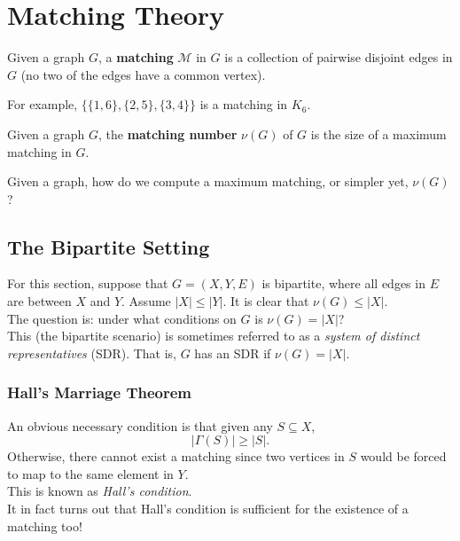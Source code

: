 
\section{Matching Theory}

\begin{fdef}
	Given a graph $G$, a \textbf{matching} $\mathcal{M}$ in $G$ is a collection of pairwise disjoint edges in $G$ (no two of the edges have a common vertex).
\end{fdef}

For example, $\{\{1,6\},\{2,5\},\{3,4\}\}$ is a matching in $K_6$.

\begin{fdef}
	Given a graph $G$, the \textbf{matching number} $\nu(G)$ of $G$ is the size of a maximum matching in $G$.
\end{fdef}

Given a graph, how do we compute a maximum matching, or simpler yet, $\nu(G)$?

	\subsection{The Bipartite Setting}

		For this section, suppose that $G = (X,Y,E)$ is bipartite, where all edges in $E$ are between $X$ and $Y$. Assume $|X| \le |Y|$.
		It is clear that $\nu(G) \le |X|$.\\

		The question is: under what conditions on $G$ is $\nu(G) = |X|$?\\
		This (the bipartite scenario) is sometimes referred to as a \emph{system of distinct representatives} (SDR). That is, $G$ has an SDR if $\nu(G) = |X|$.

		\subsubsection{Hall's Marriage Theorem}

			An obvious necessary condition is that given any $S\subseteq X$,
			\[ |\Gamma(S)| \ge |S|. \]
			Otherwise, there cannot exist a matching since two vertices in $S$ would be forced to map to the same element in $Y$.\\
			This is known as \emph{Hall's condition}.\\
			It in fact turns out that Hall's condition is sufficient for the existence of a matching too!


